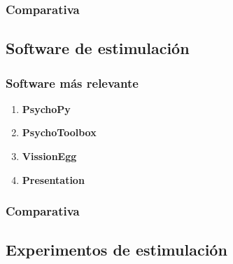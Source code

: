\documentclass[../main.tex]{subfiles}
\begin{document}
			\subsubsection{Comparativa}
			\label{ssub:02_comparativa_monitores}
			
		\subsection{Software de estimulación}
		\label{sub:02_software_de_estimulacion}
			\subsubsection{Software más relevante}
			\label{ssub:02_software_mas_relevante}
				\begin{enumerate}
					\item \textbf{PsychoPy}

					\item \textbf{PsychoToolbox}

					\item \textbf{VissionEgg}

					\item \textbf{Presentation}

				\end{enumerate}

			\subsubsection{Comparativa}
			\label{ssub:02_comparativa_software}

		\subsection{Experimentos de estimulación}
		\label{sub:02_experimentos_de_estimulacion}
\end{document}
